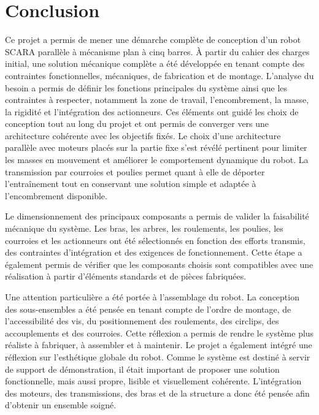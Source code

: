 
\section{Conclusion}

Ce projet a permis de mener une démarche complète de conception d’un robot SCARA parallèle à mécanisme plan à cinq barres.
\newline
À partir du cahier des charges initial, une solution mécanique complète a été développée en tenant compte des contraintes fonctionnelles, mécaniques, de fabrication et de montage.
\newline
L’analyse du besoin a permis de définir les fonctions principales du système ainsi que les contraintes à respecter, notamment la zone de travail, l’encombrement, la masse, la rigidité et l’intégration des actionneurs. 
Ces éléments ont guidé les choix de conception tout au long du projet et ont permis de converger vers une architecture cohérente avec les objectifs fixés.
\newline
Le choix d’une architecture parallèle avec moteurs placés sur la partie fixe s’est révélé pertinent pour limiter les masses en mouvement et améliorer le comportement dynamique du robot. La transmission par courroies et poulies permet quant à elle de déporter l’entraînement tout en conservant une solution simple et adaptée à l’encombrement disponible.

Le dimensionnement des principaux composants a permis de valider la faisabilité mécanique du système. Les bras, les arbres, les roulements, les poulies, les courroies et les actionneurs ont été sélectionnés en fonction des efforts transmis, des contraintes d’intégration et des exigences de fonctionnement. Cette étape a également permis de vérifier que les composants choisis sont compatibles avec une réalisation à partir d’éléments standards et de pièces fabriquées.

Une attention particulière a été portée à l’assemblage du robot. La conception des sous-ensembles a été pensée en tenant compte de l’ordre de montage, de l’accessibilité des vis, du positionnement des roulements, des circlips, des accouplements et des courroies. Cette réflexion a permis de rendre le système plus réaliste à fabriquer, à assembler et à maintenir.
\newline
\newline
Le projet a également intégré une réflexion sur l’esthétique globale du robot. Comme le système est destiné à servir de support de démonstration, il était important de proposer une solution fonctionnelle, mais aussi propre, lisible et visuellement cohérente. L’intégration des moteurs, des transmissions, des bras et de la structure a donc été pensée afin d’obtenir un ensemble soigné.

